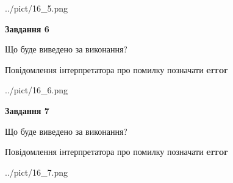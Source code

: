 \documentclass[10pt, ukrainian]{article}
\begin{document}
{\begin {large}
\begin{center}
	{../pict/16_5.png}
\end{center}
\newpage

{\begin {center}\textbf{Завдання 6}\end {center}}\par
Що буде виведено за виконання? \par
Повідомлення інтерпретатора про помилку позначати \textbf{error}

\begin{center}
	{../pict/16_6.png}
\end{center}
\newpage

{\begin {center}\textbf{Завдання 7}\end {center}}\par
Що буде виведено за виконання? \par
Повідомлення інтерпретатора про помилку позначати \textbf{error}

\begin{center}
	{../pict/16_7.png}
\end{center}
\newpage

\end {large}}
\end{document}

